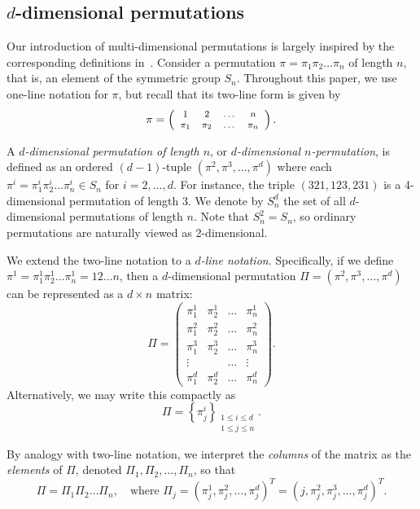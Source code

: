 \documentclass[12pt]{article}
\begin{document}
\subsection{$d$-dimensional permutations} Our introduction of multi-dimensional permutations is largely inspired by the corresponding definitions in~\cite{CFKZ24,KQ}. Consider a permutation \( \pi = \pi_1 \pi_2 \dots \pi_n \) of length \( n \), that is, an element of the symmetric group \( S_n \). Throughout this paper, we use one-line notation for \( \pi \), but recall that its two-line form is given by  
\[
{\footnotesize \pi = \left(
\begin{array}{cccc}
1 & 2 & \dots & n \\
\pi_1 & \pi_2 & \dots & \pi_n
\end{array}
\right).}
\]

A \textit{\( d \)-dimensional permutation of length \( n \)}, or \textit{\( d \)-dimensional \( n \)-permutation}, is defined as an ordered \((d-1)\)-tuple \( (\pi^2, \pi^3, \dots, \pi^d) \) where each \( \pi^i = \pi^i_1 \pi^i_2 \dots \pi^i_n \in S_n \) for \( i = 2, \dots, d \). For instance, the triple \( (321, 123, 231) \) is a 4-dimensional permutation of length 3. We denote by \( S^d_n \) the set of all \( d \)-dimensional permutations of length \( n \). Note that \( S^2_n = S_n \), so ordinary permutations are naturally viewed as 2-dimensional.

We extend the two-line notation to a \textit{\( d \)-line notation}. Specifically, if we define \( \pi^1 = \pi^1_1 \pi^1_2\ldots\pi^1_n=  12\dots n \), then a \( d \)-dimensional permutation \( \Pi = (\pi^2, \pi^3, \dots, \pi^d) \) can be represented as a \( d \times n \) matrix:  
\renewcommand{\arraystretch}{1.25}
\[
\Pi = \left(
\begin{array}{cccc}
\pi^1_1 & \pi^1_2 & \dots & \pi^1_n \\
\pi^2_1 & \pi^2_2 & \dots & \pi^2_n \\
\pi^3_1 & \pi^3_2 & \dots & \pi^3_n \\
\vdots & & \dots & \vdots \\
\pi^d_1 & \pi^d_2 & \dots & \pi^d_n
\end{array}
\right).
\]
Alternatively, we may write this compactly as  
\[
\Pi = \left\{ \pi^i_j \right\}_{\substack{1 \le i \le d \\ 1 \le j \le n}}.
\]

By analogy with two-line notation, we interpret the \textit{columns} of the matrix as the \textit{elements} of \( \Pi \), denoted \( \Pi_1, \Pi_2, \dots, \Pi_n \), so that
\[
\Pi = \Pi_1 \Pi_2 \dots \Pi_n, \quad \text{where } \Pi_j = (\pi^1_j, \pi^2_j, \dots, \pi^d_j)^T = (j, \pi^2_j, \pi^3_j, \dots, \pi^d_j)^T.
\]
\end{document}
